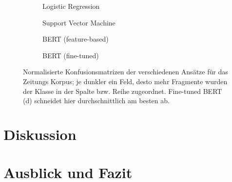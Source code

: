 \begin{figure}
\centering
\begin{subfigure}[b]{.45\linewidth}

\caption{Logistic Regression}\label{fig:zeitung-log}
\end{subfigure}
\begin{subfigure}[b]{.45\linewidth}

\caption{Support Vector Machine}\label{fig:zeitung-svm}
\end{subfigure}

\begin{subfigure}[b]{.45\linewidth}

\caption{BERT (feature-based)}\label{fig:zeitung-feat}
\end{subfigure}
\begin{subfigure}[b]{.45\linewidth}

\caption{BERT (fine-tuned)}\label{fig:zeitung-fine}
\end{subfigure}
\caption{Normalisierte Konfusionsmatrizen der verschiedenen Ansätze für das Zeitungs Korpus; je dunkler ein Feld, desto mehr Fragmente wurden der Klasse in der Spalte bzw. Reihe zugeordnet. Fine-tuned BERT (d) schneidet hier durchschnittlich am besten ab.}
\label{fig:roman}
\end{figure}





\chapter{Diskussion}
\label{diskussion}



\chapter{Ausblick und Fazit}
\label{ausblick}



\nocite{*}
